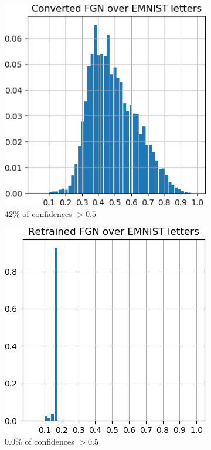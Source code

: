 \documentclass[12pt,oneside]{CUNY_PhD}
\begin{document}
\begin{figure}[!htbp]
\begin{subfigure}[t]{0.32\textwidth}
        \includegraphics[width=\textwidth]{images/Letters/hist-converted-letters.png}
        \caption*{42\% of confidences $>0.5$}
    \end{subfigure}
    \begin{subfigure}[t]{0.32\textwidth}
        \includegraphics[width=\textwidth]{images/Letters/hist-retrained-letters.png}
        \caption*{0.0\% of confidences $>0.5$}
    \end{subfigure}
    \caption{}
    \label{fig:hist-letters}
\end{figure}
\end{document}
